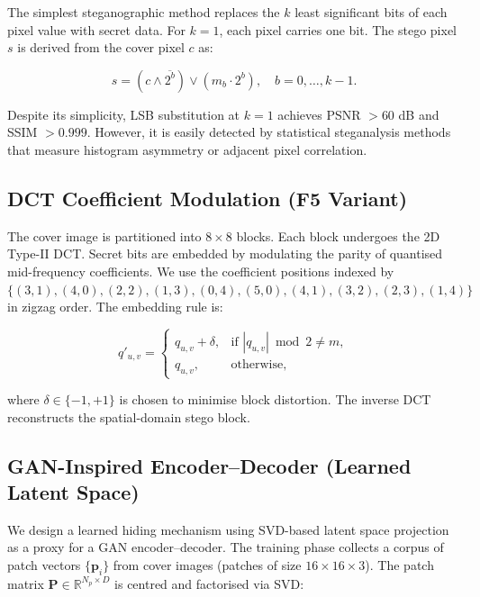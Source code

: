 \documentclass[conference]{IEEEtran}
\begin{document}
The simplest steganographic method replaces the $k$ least significant bits of each pixel value with secret data. For $k=1$, each pixel carries one bit. The stego pixel $s$ is derived from the cover pixel $c$ as:

\begin{equation}
s = (c \land \overline{2^b}) \lor (m_b \cdot 2^b), \quad b = 0,\dots,k-1.
\label{eq:lsb}
\end{equation}

Despite its simplicity, LSB substitution at $k=1$ achieves PSNR $> 60$ dB and SSIM $> 0.999$. However, it is easily detected by statistical steganalysis methods that measure histogram asymmetry or adjacent pixel correlation.

\subsection{DCT Coefficient Modulation (F5 Variant)}

The cover image is partitioned into $8\times8$ blocks. Each block undergoes the 2D Type-II DCT. Secret bits are embedded by modulating the parity of quantised mid-frequency coefficients. We use the coefficient positions indexed by $\{(3,1), (4,0), (2,2), (1,3), (0,4), (5,0), (4,1), (3,2), (2,3), (1,4)\}$ in zigzag order. The embedding rule is:

\begin{equation}
q'_{u,v} = \begin{cases}
q_{u,v} + \delta, & \text{if } |q_{u,v}| \bmod 2 \neq m,\\
q_{u,v}, & \text{otherwise},
\end{cases}
\label{eq:dct}
\end{equation}

where $\delta \in \{-1, +1\}$ is chosen to minimise block distortion. The inverse DCT reconstructs the spatial-domain stego block.

\subsection{GAN-Inspired Encoder--Decoder (Learned Latent Space)}

We design a learned hiding mechanism using SVD-based latent space projection as a proxy for a GAN encoder--decoder. The training phase collects a corpus of patch vectors $\{\mathbf{p}_i\}$ from cover images (patches of size $16\times16\times3$). The patch matrix $\mathbf{P} \in \mathbb{R}^{N_p \times D}$ is centred and factorised via SVD:
\end{document}
